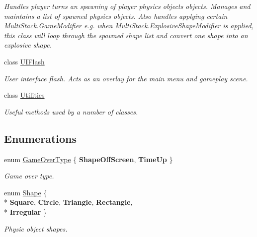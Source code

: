 \begin{DoxyCompactItemize}
\begin{DoxyCompactList}\small\item\em Handles player turns an spawning of player physics objects objects. Manages and maintains a list of spawned physics objects. Also handles applying certain \hyperlink{class_multi_stack_1_1_game_modifier}{Multi\+Stack.\+Game\+Modifier} e.\+g. when \hyperlink{class_multi_stack_1_1_explosive_shape_modifier}{Multi\+Stack.\+Explosive\+Shape\+Modifier} is applied, this class will loop through the spawned shape list and convert one shape into an explosive shape. \end{DoxyCompactList}\item 
class \hyperlink{class_multi_stack_1_1_u_i_flash}{U\+I\+Flash}
\begin{DoxyCompactList}\small\item\em User interface flash. Acts as an overlay for the main menu and gameplay scene. \end{DoxyCompactList}\item 
class \hyperlink{class_multi_stack_1_1_utilities}{Utilities}
\begin{DoxyCompactList}\small\item\em Useful methods used by a number of classes. \end{DoxyCompactList}\end{DoxyCompactItemize}
\subsection*{Enumerations}
\begin{DoxyCompactItemize}
\item 
enum \hyperlink{namespace_multi_stack_a19d387de624d6945620427c53c4f0c10}{Game\+Over\+Type} \{ {\bfseries Shape\+Off\+Screen}, 
{\bfseries Time\+Up}
 \}\begin{DoxyCompactList}\small\item\em Game over type. \end{DoxyCompactList}
\item 
enum \hyperlink{namespace_multi_stack_ac7f637887fea673ceeae6fdd0598c048}{Shape} \{ \\*
{\bfseries Square}, 
{\bfseries Circle}, 
{\bfseries Triangle}, 
{\bfseries Rectangle}, 
\\*
{\bfseries Irregular}
 \}\begin{DoxyCompactList}\small\item\em Physic object shapes. \end{DoxyCompactList}
\end{DoxyCompactItemize}
